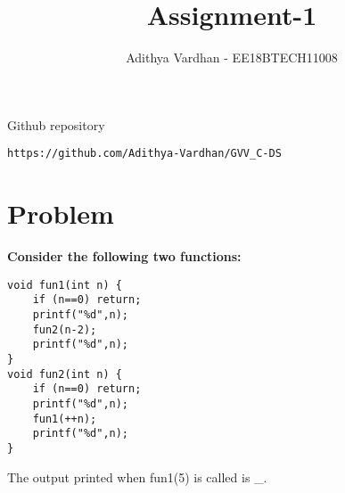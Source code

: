 \documentclass[journal,12pt,twocolumn]{IEEEtran}
\begin{document}
     \def\rightbox#1{\makebox[0in][r]{#1}}
     \def\centbox#1{\makebox[0in]{#1}}
     \def\topbox#1{\raisebox{-\baselineskip}[0in][0in]{#1}}
     \def\midbox#1{\raisebox{-0.5\baselineskip}[0in][0in]{#1}}
\vspace{3cm}
\title{Assignment-1}
\author{Adithya Vardhan - EE18BTECH11008}
\maketitle
\newpage
\bigskip
\renewcommand{\thefigure}{\theenumi}
\renewcommand{\thetable}{\theenumi}
Github repository
\begin{lstlisting}
https://github.com/Adithya-Vardhan/GVV_C-DS
\end{lstlisting}
%
\section{\textbf{Problem}}
\textbf{Consider the following two functions:}
\begin{tcolorbox}
\begin{verbatim}
void fun1(int n) {
    if (n==0) return;
    printf("%d",n);
    fun2(n-2);
    printf("%d",n);
}
void fun2(int n) {
    if (n==0) return;
    printf("%d",n);
    fun1(++n);
    printf("%d",n);
}
\end{verbatim}
\end{tcolorbox}
The output printed when fun1(5) is called is \_.
\end{document}

